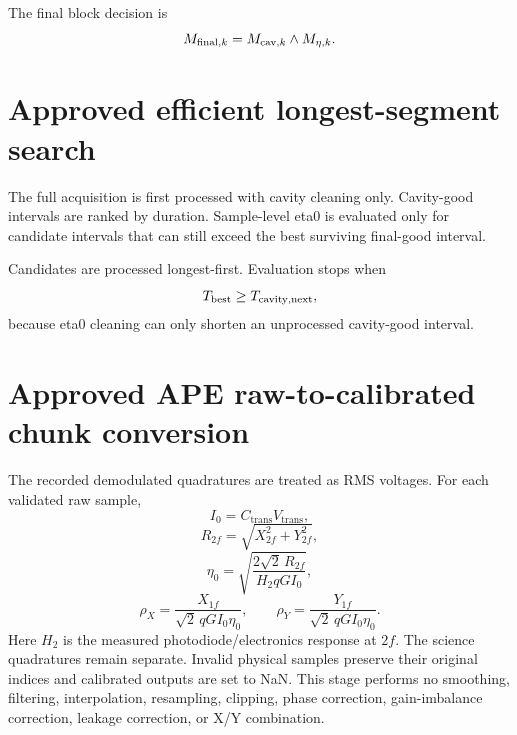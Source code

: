 \documentclass{article}
\begin{document}
The final block decision is
\begin{equation}
M_{{\rm final},k}=M_{{\rm cav},k}\land M_{\eta,k}.
\end{equation}

\section*{Approved efficient longest-segment search}

The full acquisition is first processed with cavity cleaning only.
Cavity-good intervals are ranked by duration. Sample-level eta0 is evaluated
only for candidate intervals that can still exceed the best surviving
final-good interval.

Candidates are processed longest-first. Evaluation stops when
\begin{equation}
T_{\rm best}\ge T_{\rm cavity,next},
\end{equation}
because eta0 cleaning can only shorten an unprocessed cavity-good interval.

\section*{Approved APE raw-to-calibrated chunk conversion}

The recorded demodulated quadratures are treated as RMS voltages. For each
validated raw sample,
\begin{equation}
I_0 = C_{\mathrm{trans}} V_{\mathrm{trans}},
\end{equation}
\begin{equation}
R_{2f}=\sqrt{X_{2f}^2+Y_{2f}^2},
\end{equation}
\begin{equation}
\eta_0 =
\sqrt{
\frac{2\sqrt{2}\,R_{2f}}
{H_2 q G I_0}
},
\end{equation}
\begin{equation}
\rho_X =
\frac{X_{1f}}
{\sqrt{2}\,qGI_0\eta_0},
\qquad
\rho_Y =
\frac{Y_{1f}}
{\sqrt{2}\,qGI_0\eta_0}.
\end{equation}
Here $H_2$ is the measured photodiode/electronics response at $2f$.
The science quadratures remain separate. Invalid physical samples preserve
their original indices and calibrated outputs are set to NaN. This stage
performs no smoothing, filtering, interpolation, resampling, clipping, phase
correction, gain-imbalance correction, leakage correction, or X/Y combination.
\end{document}

